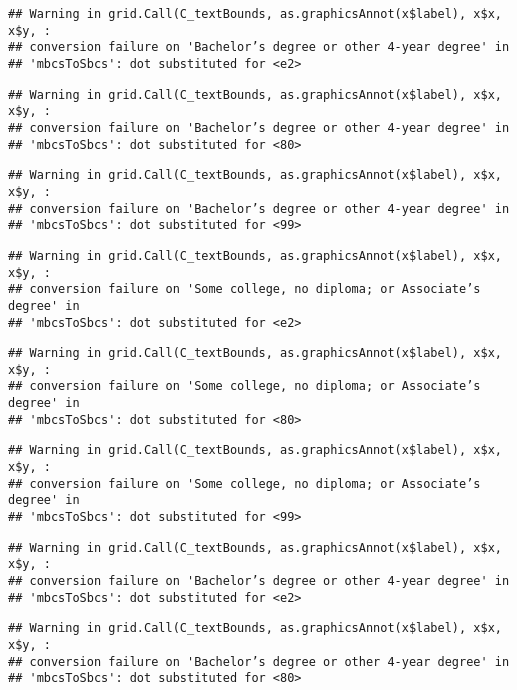 \documentclass[
]{article}
\begin{document}
\begin{verbatim}
## Warning in grid.Call(C_textBounds, as.graphicsAnnot(x$label), x$x, x$y, :
## conversion failure on 'Bachelor’s degree or other 4-year degree' in
## 'mbcsToSbcs': dot substituted for <e2>
\end{verbatim}

\begin{verbatim}
## Warning in grid.Call(C_textBounds, as.graphicsAnnot(x$label), x$x, x$y, :
## conversion failure on 'Bachelor’s degree or other 4-year degree' in
## 'mbcsToSbcs': dot substituted for <80>
\end{verbatim}

\begin{verbatim}
## Warning in grid.Call(C_textBounds, as.graphicsAnnot(x$label), x$x, x$y, :
## conversion failure on 'Bachelor’s degree or other 4-year degree' in
## 'mbcsToSbcs': dot substituted for <99>
\end{verbatim}

\begin{verbatim}
## Warning in grid.Call(C_textBounds, as.graphicsAnnot(x$label), x$x, x$y, :
## conversion failure on 'Some college, no diploma; or Associate’s degree' in
## 'mbcsToSbcs': dot substituted for <e2>
\end{verbatim}

\begin{verbatim}
## Warning in grid.Call(C_textBounds, as.graphicsAnnot(x$label), x$x, x$y, :
## conversion failure on 'Some college, no diploma; or Associate’s degree' in
## 'mbcsToSbcs': dot substituted for <80>
\end{verbatim}

\begin{verbatim}
## Warning in grid.Call(C_textBounds, as.graphicsAnnot(x$label), x$x, x$y, :
## conversion failure on 'Some college, no diploma; or Associate’s degree' in
## 'mbcsToSbcs': dot substituted for <99>
\end{verbatim}

\begin{verbatim}
## Warning in grid.Call(C_textBounds, as.graphicsAnnot(x$label), x$x, x$y, :
## conversion failure on 'Bachelor’s degree or other 4-year degree' in
## 'mbcsToSbcs': dot substituted for <e2>
\end{verbatim}

\begin{verbatim}
## Warning in grid.Call(C_textBounds, as.graphicsAnnot(x$label), x$x, x$y, :
## conversion failure on 'Bachelor’s degree or other 4-year degree' in
## 'mbcsToSbcs': dot substituted for <80>
\end{verbatim}
\end{document}
